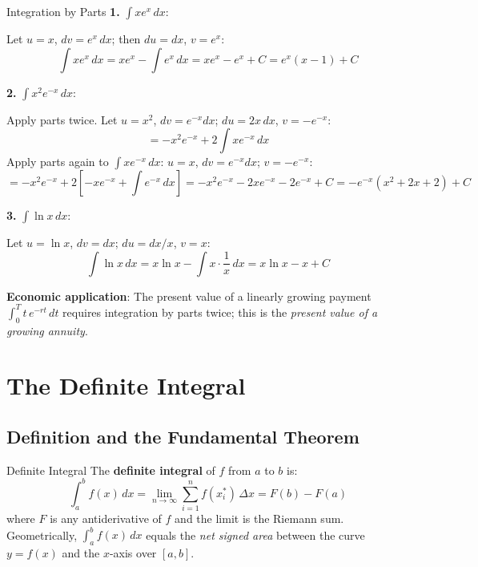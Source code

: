 \documentclass[12pt, a4paper]{article}
\theoremstyle{definition}
\newcommand{\dd}[1]{\,d#1}
\begin{document}
\begin{exbox}{Integration by Parts}
\textbf{1.} $\displaystyle\int x e^x\dd{x}$:

Let $u=x$, $dv=e^x\,dx$; then $du=dx$, $v=e^x$:
\[
  \int xe^x\dd{x} = xe^x - \int e^x\dd{x} = xe^x - e^x + C = e^x(x-1) + C
\]

\textbf{2.} $\displaystyle\int x^2 e^{-x}\dd{x}$:

Apply parts twice. Let $u=x^2$, $dv=e^{-x}dx$; $du=2x\,dx$, $v=-e^{-x}$:
\[
  = -x^2 e^{-x} + 2\int xe^{-x}\dd{x}
\]
Apply parts again to $\int xe^{-x}\dd{x}$: $u=x$, $dv=e^{-x}dx$; $v=-e^{-x}$:
\[
  = -x^2 e^{-x} + 2\left[-xe^{-x} + \int e^{-x}\dd{x}\right]
  = -x^2 e^{-x} - 2xe^{-x} - 2e^{-x} + C
  = -e^{-x}(x^2+2x+2) + C
\]

\textbf{3.} $\displaystyle\int \ln x\dd{x}$:

Let $u=\ln x$, $dv=dx$; $du=dx/x$, $v=x$:
\[
  \int\ln x\dd{x} = x\ln x - \int x\cdot\frac{1}{x}\dd{x} = x\ln x - x + C
\]

\textbf{Economic application}: The present value of a linearly growing payment
$\int_0^T t\,e^{-rt}\dd{t}$ requires integration by parts twice; this is the
\emph{present value of a growing annuity}.
\end{exbox}

\section{The Definite Integral}

\subsection{Definition and the Fundamental Theorem}

\begin{defbox}{Definite Integral}
The \textbf{definite integral} of $f$ from $a$ to $b$ is:
\[
  \int_a^b f(x)\dd{x} = \lim_{n\to\infty}\sum_{i=1}^n f(x_i^*)\,\Delta x
  = F(b) - F(a)
\]
where $F$ is any antiderivative of $f$ and the limit is the Riemann sum.
Geometrically, $\int_a^b f(x)\dd{x}$ equals the \emph{net signed area}
between the curve $y=f(x)$ and the $x$-axis over $[a,b]$.
\end{defbox}
\end{document}
